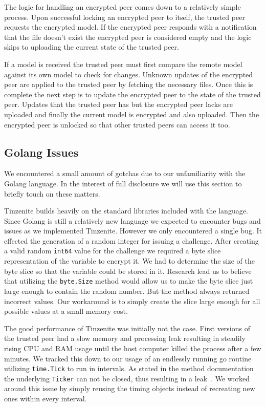 The logic for handling an encrypted peer comes down to a relatively simple process.
Upon successful locking an encrypted peer to itself, the trusted peer requests the encrypted model.
If the encrypted peer responds with a notification that the file doesn't exist the encrypted peer is considered empty and the logic skips to uploading the current state of the trusted peer.

If a model is received the trusted peer must first compare the remote model against its own model to check for changes.
Unknown updates of the encrypted peer are applied to the trusted peer by fetching the necessary files.
Once this is complete the next step is to update the encrypted peer to the state of the trusted peer.
Updates that the trusted peer has but the encrypted peer lacks are uploaded and finally the current model is encrypted and also uploaded.
Then the encrypted peer is unlocked so that other trusted peers can access it too.

\subsection{Golang Issues}
\label{sub:Golang Issues}

We encountered a small amount of gotchas due to our unfamiliarity with the Golang language.
In the interest of full disclosure we will use this section to briefly touch on these matters.

Tinzenite builds heavily on the standard libraries included with the language.
Since Golang is still a relatively new language we expected to encounter bugs and issues as we implemented Tinzenite.
However we only encountered a single bug.
It effected the generation of a random integer for issuing a challenge.
After creating a valid random \texttt{int64} value for the challenge we required a byte slice representation of the variable to encrypt it.
We had to determine the size of the byte slice so that the variable could be stored in it.
Research lead us to believe that utilizing the \texttt{byte.Size} method would allow us to make the byte slice just large enough to contain the random number.
But the method always returned incorrect values.
Our workaround is to simply create the slice large enough for all possible values at a small memory cost.

The good performance of Tinzenite was initially not the case.
First versions of the trusted peer had a slow memory and processing leak resulting in steadily rising CPU and RAM usage until the host computer killed the process after a few minutes.
We tracked this down to our usage of an endlessly running go routine utilizing \texttt{time.Tick} to run in intervals.
As stated in the method documentation the underlying \texttt{Ticker} can not be closed, thus resulting in a leak~\cite{web:site:golang:time:tick}.
We worked around this issue by simply reusing the timing objects instead of recreating new ones within every interval.


